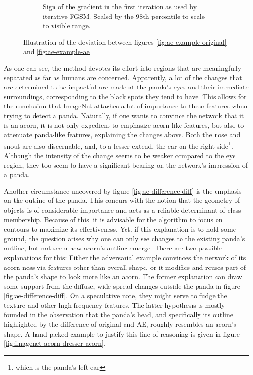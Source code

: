 \documentclass[11pt, a4paper]{article}
\begin{document}
\begin{figure}[h!tb]
\begin{subfigure}[t]{0.45\textwidth}
        \caption{Sign of the gradient in the first iteration as used by iterative FGSM. Scaled by the 98th percentile to scale to visible range.}
        \label{fig:ae-difference-grad}
    \end{subfigure}
    \caption[Difference between original and adversarial example]{Illustration of the deviation between figures \ref{fig:ae-example-original} and \ref{fig:ae-example-ae}}
    \label{fig:ae-difference}
\end{figure}

As one can see, the method devotes its effort into regions that are meaningfully separated as far as humans are concerned. Apparently, a lot of the changes that are determined to be impactful are made at the panda's eyes and their immediate surroundings, corresponding to the black spots they tend to have. This allows for the conclusion that ImageNet attaches a lot of importance to these features when trying to detect a panda. Naturally, if one wants to convince the network that it is an acorn, it is not only expedient to emphasize acorn-like features, but also to attenuate panda-like features, explaining the changes above. Both the nose and snout are also discernable, and, to a lesser extend, the ear on the right side\footnote{which is the panda's left ear}. Although the intensity of the change seems to be weaker compared to the eye region, they too seem to have a significant bearing on the network's impression of a panda.

Another circumstance uncovered by figure \ref{fig:ae-difference-diff} is the emphasis on the outline of the panda. This concurs with the notion that the geometry of objects is of considerable importance and acts as a reliable determinant of class membership. Because of this, it is advisable for the algorithm to focus on contours to maximize its effectiveness. Yet, if this explanation is to hold some ground, the question arises why one can only see changes to the existing panda's outline, but not see a new acorn's outline emerge. There are two possible explanations for this: Either the adversarial example convinces the network of its acorn-ness via features other than overall shape, or it modifies and reuses part of the panda's shape to look more like an acorn. The former explanation can draw some support from the diffuse, wide-spread changes outside the panda in figure \ref{fig:ae-difference-diff}. On a speculative note, they might serve to fudge the texture and other high-frequency features. The latter hypothesis is mostly founded in the observation that the panda's head, and specifically its outline highlighted by the difference of original and AE, roughly resembles an acorn's shape. A hand-picked example to justify this line of reasoning is given in figure \ref{fig:imagenet-acorn-dresser-acorn}.
\end{document}
